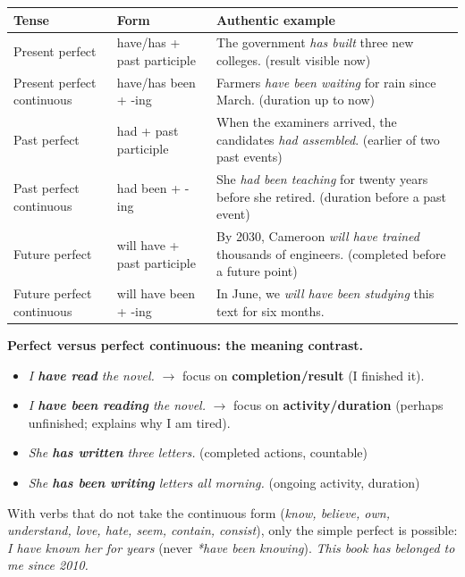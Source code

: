 \documentclass[11pt]{article}
\begin{document}
\begin{center}
\begin{tabularx}{\linewidth}{|l|X|X|}
\hline
\rowcolor{popblueL} \textbf{Tense} & \textbf{Form} & \textbf{Authentic example} \\
\hline
Present perfect & have/has + past participle & The government \emph{has built} three new colleges. (result visible now) \\
\hline
Present perfect continuous & have/has been + -ing & Farmers \emph{have been waiting} for rain since March. (duration up to now) \\
\hline
Past perfect & had + past participle & When the examiners arrived, the candidates \emph{had assembled}. (earlier of two past events) \\
\hline
Past perfect continuous & had been + -ing & She \emph{had been teaching} for twenty years before she retired. (duration before a past event) \\
\hline
Future perfect & will have + past participle & By 2030, Cameroon \emph{will have trained} thousands of engineers. (completed before a future point) \\
\hline
Future perfect continuous & will have been + -ing & In June, we \emph{will have been studying} this text for six months. \\
\hline
\end{tabularx}
\end{center}

\textbf{Perfect versus perfect continuous: the meaning contrast.}\par
\begin{itemize}
\item \emph{I \textbf{have read} the novel.} $\rightarrow$ focus on \textbf{completion/result} (I finished it).
\item \emph{I \textbf{have been reading} the novel.} $\rightarrow$ focus on \textbf{activity/duration} (perhaps unfinished; explains why I am tired).
\item \emph{She \textbf{has written} three letters.} (completed actions, countable)
\item \emph{She \textbf{has been writing} letters all morning.} (ongoing activity, duration)
\end{itemize}
With verbs that do not take the continuous form (\emph{know, believe, own, understand, love, hate, seem, contain, consist}), only the simple perfect is possible: \emph{I have known her for years} (never \emph{*have been knowing}). \emph{This book has belonged to me since 2010.}
\end{document}
